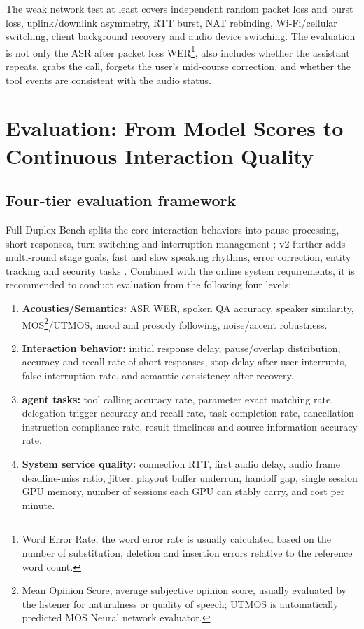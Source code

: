 \documentclass[UTF8,fontset=none,a4paper,10pt]{ctexart}
\begin{document}
The weak network test at least covers independent random packet loss and burst loss, uplink/downlink asymmetry, RTT burst, NAT rebinding, Wi-Fi/cellular switching, client background recovery and audio device switching. The evaluation is not only the ASR after packet loss WER\footnote{Word Error Rate, the word error rate is usually calculated based on the number of substitution, deletion and insertion errors relative to the reference word count. }, also includes whether the assistant repeats, grabs the call, forgets the user's mid-course correction, and whether the tool events are consistent with the audio status.

\section{Evaluation: From Model Scores to Continuous Interaction Quality}

\subsection{Four-tier evaluation framework}

Full-Duplex-Bench splits the core interaction behaviors into pause processing, short responses, turn switching and interruption management \cite{en:lin2025fullduplexbench}; v2 further adds multi-round stage goals, fast and slow speaking rhythms, error correction, entity tracking and security tasks \cite{en:lin2026fullduplexbenchv2}. Combined with the online system requirements, it is recommended to conduct evaluation from the following four levels:

\begin{enumerate}
\item \textbf{ Acoustics/Semantics: }ASR WER, spoken QA accuracy, speaker similarity, MOS\footnote{Mean Opinion Score, average subjective opinion score, usually evaluated by the listener for naturalness or quality of speech; UTMOS is automatically predicted MOS Neural network evaluator. }/UTMOS, mood and prosody following, noise/accent robustness.
\item \textbf{ Interaction behavior: } initial response delay, pause/overlap distribution, accuracy and recall rate of short responses, stop delay after user interrupts, false interruption rate, and semantic consistency after recovery.
\item \textbf{ agent tasks: } tool calling accuracy rate, parameter exact matching rate, delegation trigger accuracy and recall rate, task completion rate, cancellation instruction compliance rate, result timeliness and source information accuracy rate.
\item \textbf{ System service quality: }connection RTT, first audio delay, audio frame deadline-miss ratio, jitter, playout buffer underrun, handoff gap, single session GPU memory, number of sessions each GPU can stably carry, and cost per minute.
\end{enumerate}
\end{document}

